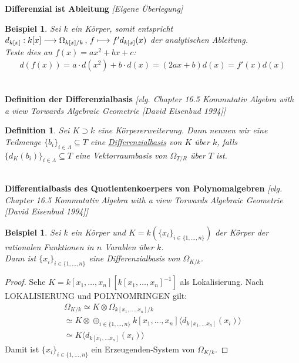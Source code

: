 \documentclass[10pt,a4paper]{report}
\newcommand{\comment}[1]{}
\newcommand{\ModulsOfDifferenzials}{Kommutativ Algebra with a view Torwards Algebraic Geometrie [David Eisenbud 1994]}
\newcounter{Aussage}[chapter]
\newtheorem{definition}[Aussage]{Definition}
\newtheorem{bsp}[Aussage]{Beispiel}
\newcommand{\function}[5]{\nolinebreak{#1:#2 \longrightarrow #3 \, , \, #4 \longmapsto #5}}
\newcommand{\divR}[2]{\Omega_{#1/#2}}
\newcommand{\divf}[1]{d_{#1}}
\newcommand{\tensor}[3]{#1 \otimes #3}
\newcommand{\lok}[2]{#1 [#2^{-1}]}
\begin{document}
\textbf{Differenzial ist Ableitung} \textit{[Eigene Überlegung]}
\begin{bsp}\comment{\label{Differenzial ist Ableitung}}
Sei $k$ ein Körper, somit entspricht $\function{\divf{k[x]}}{k[x]}{\divR{k[x]}{k}}{f}{f'\divf{k[x]}(x)}$ der analytischen Ableitung.\\
Teste dies an $f(x)=ax^2 + bx +c$:
\begin{gather*}
d(f(x)) = a \cdot d(x^2) + b \cdot d(x) = (2ax + b) d(x) = f'(x) d(x) 
\end{gather*}
\comment{lässt sich induktiv für Monome leicht zeigen}
\end{bsp}


\ \\
\textbf{Definition der Differenzialbasis} \textit{[vlg. Chapter 16.5 \ModulsOfDifferenzials]}
\begin{definition}\comment{\label{Definition der Differenzialbasis}}
Sei $K \supset k$ eine Körpererweiterung. Dann nennen wir eine Teilmenge $\lbrace b_i \rbrace_{i \in \Lambda} \subseteq T$ eine \underline{Differenzialbasis} von $K$ über $k$, falls $\lbrace \divf{K}(b_i)\rbrace_{i \in \Lambda} \subseteq T$ eine Vektorraumbasis von $\divR{T}{R}$ über $T$ ist.
\end{definition}


\ \\
\textbf{Differentialbasis des Quotientenkoerpers von Polynomalgebren} \textit{[vlg. Chapter 16.5 \ModulsOfDifferenzials]}
\begin{bsp}\comment{\label{Differentialbasis des Quotientenkoerpers von Polynomalgebren}}
Sei $k$ ein Körper und $K = k(\lbrace x_i \rbrace_{i \in \lbrace 1,\dots,n \rbrace})$ der Körper der rationalen Funktionen in $n$ Varablen über $k$.\\
Dann ist $\lbrace x_i \rbrace_{i \in \lbrace 1,\dots,n \rbrace}$ eine Differenzialbasis von $\divR{K}{k}$.
\end{bsp}
\begin{proof}
Sehe $K = \lok{k[x_1,\dots,x_n]}{k[x_1,\dots,x_n]}$ als Lokalisierung. Nach LOKALISIERUNG und POLYNOMRINGEN gilt:
\begin{gather*}
\divR{K}{k} \simeq \tensor{K}{k[x_1,\dots,x_n]}{\divR{k[x_1,\dots,x_n]}{k}} \\
\simeq \tensor{K}{k[x_1,\dots,x_n]}{\oplus_{i \in \lbrace 1,\dots,n \rbrace} k[x_1,\dots,x_n]\langle \divf{k[x_1,\dots x_n]}(x_i) \rangle} \\
\simeq K\langle \divf{k[x_1,\dots x_n]}(x_i) \rangle
\end{gather*}
Damit ist $\lbrace x_i \rbrace_{i \in \lbrace 1,\dots,n \rbrace}$ ein Erzeugenden-System von $\divR{K}{k}$.
\end{proof}
\end{document}
